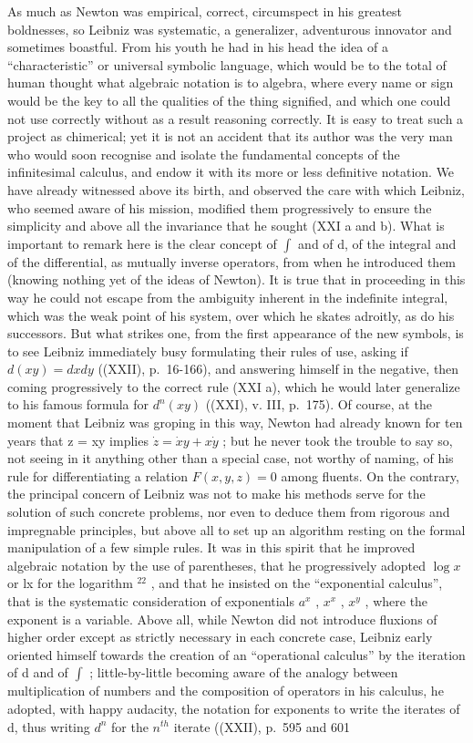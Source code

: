 As much as Newton was empirical, correct, circumspect in his greatest boldnesses, so Leibniz was systematic, a generalizer, adventurous innovator and sometimes boastful. From his youth he had in his head the idea of a ``characteristic'' or universal symbolic language, which would be to the total of human thought what algebraic notation is to algebra, where every name or sign would be the key to all the qualities of the thing signified, and which one could not use correctly without as a result reasoning correctly. It is easy to treat such a project as chimerical; yet it is not an accident that its author was the very man who would soon recognise and isolate the fundamental concepts of the infinitesimal calculus, and endow it with its more or less definitive notation. We have already witnessed above its birth, and observed the care with which Leibniz, who seemed aware of his mission, modified them progressively to ensure the simplicity and above all the invariance that he sought (XXI a and b). What is important to remark here is the clear concept of \(\int\) and of d, of the integral and of the differential, as mutually inverse operators, from when he introduced them (knowing nothing yet of the ideas of Newton). It is true that in proceeding in this way he could not escape from the ambiguity inherent in the indefinite integral, which was the weak point of his system, over which he skates adroitly, as do his successors. But what strikes one, from the first appearance of the new symbols, is to see Leibniz immediately busy formulating their rules of use, asking if \(d(xy) = dx dy\) ((XXII), p.~16-166), and answering himself in the negative, then coming progressively to the correct rule (XXI a), which he would later generalize to his famous formula for \(d^{n}(xy)\) ((XXI), v. III, p.~175). Of course, at the moment that Leibniz was groping in this way, Newton had already known for ten years that z = xy implies \(\dot{z} = \dot{x}y + x\dot{y}\) ; but he never took the trouble to say so, not seeing in it anything other than a special case, not worthy of naming, of his rule for differentiating a relation \(F(x, y, z) = 0\) among fluents. On the contrary, the principal concern of Leibniz was not to make his methods serve for the solution of such concrete problems, nor even to deduce them from rigorous and impregnable principles, but above all to set up an algorithm resting on the formal manipulation of a few simple rules. It was in this spirit that he improved algebraic notation by the use of parentheses, that he progressively adopted \(\log x\) or lx for the logarithm \({}^{22}\) , and that he insisted on the ``exponential calculus'', that is the systematic consideration of exponentials \(a^{x}\) , \(x^{x}\) , \(x^{y}\) , where the exponent is a variable. Above all, while Newton did not introduce fluxions of higher order except as strictly necessary in each concrete case, Leibniz early oriented himself towards the creation of an ``operational calculus'' by the iteration of d and of \(\int\) ; little-by-little becoming aware of the analogy between multiplication of numbers and the composition of operators in his calculus, he adopted, with happy audacity, the notation for exponents to write the iterates of d, thus writing \(d^{n}\) for the \(n^{th}\) iterate ((XXII), p.~595 and 601 
